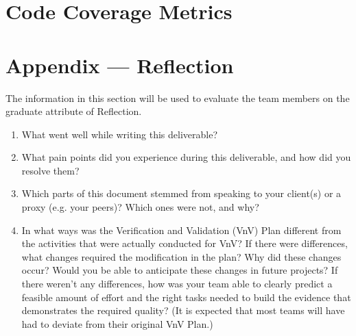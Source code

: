 \documentclass[12pt, titlepage]{article}
\begin{document}
\section{Code Coverage Metrics}




\newpage{}
\section*{Appendix --- Reflection}

The information in this section will be used to evaluate the team members on the
graduate attribute of Reflection.



\begin{enumerate}
  \item What went well while writing this deliverable? 
  \item What pain points did you experience during this deliverable, and how
    did you resolve them?
  \item Which parts of this document stemmed from speaking to your client(s) or
  a proxy (e.g. your peers)? Which ones were not, and why?
  \item In what ways was the Verification and Validation (VnV) Plan different
  from the activities that were actually conducted for VnV?  If there were
  differences, what changes required the modification in the plan?  Why did
  these changes occur?  Would you be able to anticipate these changes in future
  projects?  If there weren't any differences, how was your team able to clearly
  predict a feasible amount of effort and the right tasks needed to build the
  evidence that demonstrates the required quality?  (It is expected that most
  teams will have had to deviate from their original VnV Plan.)
\end{enumerate}
\end{document}
